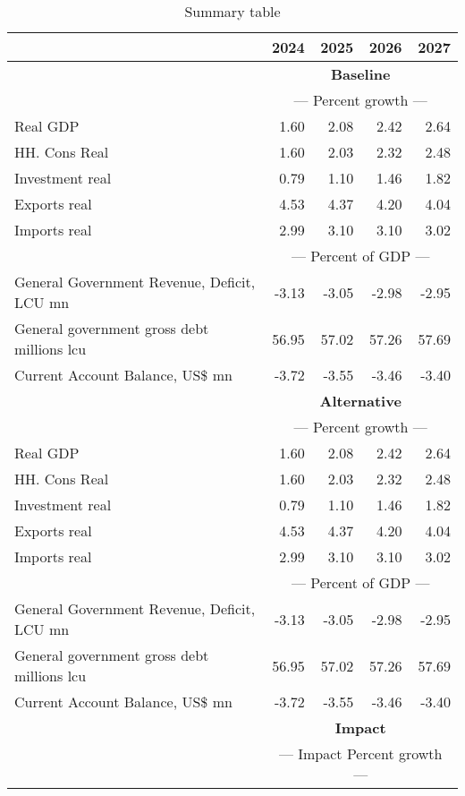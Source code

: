 \documentclass{article}
\begin{document}
\begin{table}[ht]
\caption{Summary table}
\begin{tabular}{lrrrr}
\toprule
 & 2024 & 2025 & 2026 & 2027 \\
\midrule
&\multicolumn{4}{c}{{\large \textbf{Baseline}}}                     \\
&\multicolumn{4}{c}{{---  Percent growth ---}}                     \\
Real GDP & 1.60 & 2.08 & 2.42 & 2.64 \\
HH. Cons Real & 1.60 & 2.03 & 2.32 & 2.48 \\
Investment real & 0.79 & 1.10 & 1.46 & 1.82 \\
Exports real & 4.53 & 4.37 & 4.20 & 4.04 \\
Imports real & 2.99 & 3.10 & 3.10 & 3.02 \\
&\multicolumn{4}{c}{{---  Percent of GDP ---}}                     \\
General Government Revenue, Deficit, LCU mn & -3.13 & -3.05 & -2.98 & -2.95 \\
General government gross debt millions lcu & 56.95 & 57.02 & 57.26 & 57.69 \\
Current Account Balance, US\$ mn & -3.72 & -3.55 & -3.46 & -3.40 \\
&\multicolumn{4}{c}{{\large \textbf{Alternative}}}                     \\
&\multicolumn{4}{c}{{---  Percent growth ---}}                     \\
Real GDP & 1.60 & 2.08 & 2.42 & 2.64 \\
HH. Cons Real & 1.60 & 2.03 & 2.32 & 2.48 \\
Investment real & 0.79 & 1.10 & 1.46 & 1.82 \\
Exports real & 4.53 & 4.37 & 4.20 & 4.04 \\
Imports real & 2.99 & 3.10 & 3.10 & 3.02 \\
&\multicolumn{4}{c}{{---  Percent of GDP ---}}                     \\
General Government Revenue, Deficit, LCU mn & -3.13 & -3.05 & -2.98 & -2.95 \\
General government gross debt millions lcu & 56.95 & 57.02 & 57.26 & 57.69 \\
Current Account Balance, US\$ mn & -3.72 & -3.55 & -3.46 & -3.40 \\
&\multicolumn{4}{c}{{\large \textbf{Impact}}}                     \\
&\multicolumn{4}{c}{{--- Impact Percent growth ---}}                     \\

\end{tabular}
\end{table}
\end{document}
